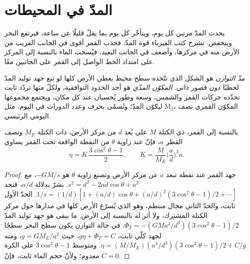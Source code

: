 \section{المدّ في المحيطات}\label{sec:b3:ocean-dynamics:tides}

يحدث المدّ مرتين كل يوم، ويتأخّر كل يوم بما يقلّ قليلًا عن ساعة، فيرتفع البحر
وينخفض. تشرح كتب الفيزياء قوة المدّ: فجذب القمر
أقوى في الجانب القريب من الأرض منه في مركزها، وأضعف في
الجانب البعيد، فيُسحب الماء بالنسبة إلى المركز على امتداد
الخط الواصل إلى القمر على الجانبين معًا.

\begin{definition}\label{def:b3:ocean-dynamics:tides}
\emph{مدّ التوازن} هو الشكل الذي تتّخذه
سطح محيط يغطي الأرض كلها لو تبع جهد توليد المدّ
لحظيًا دون قصور ذاتي. \emph{المكوّن
المدّي} هو أحد الحدود التوافقية، ولكلّ منها
تردّد ثابت تحدّده حركات القمر والشمس، وسعة وطور يُحسبان
عند كل مكان، ويجتمع مجموعها ليكوّن المدّ؛ وتُسمّى
بحرف وعدد الدورات في اليوم، مثل M$_2$، المكوّن
القمري نصف اليومي الرئيسي.
\end{definition}

\begin{theorem}\label{thm:b3:ocean-dynamics:equilibrium-tide}
بالنسبة إلى القمر، ذي الكتلة $M$ على بُعد $d$ من مركز الأرض، ذات
الكتلة $M_E$ ونصف القطر $a$، فإنّ  عند زاوية $\theta$ من
النقطة الواقعة تحت القمر يساوي
\[
\eta = K\,\frac{3\cos^2\theta - 1}{2},\qquad
K = \frac{M}{M_E}\Big(\frac{a}{d}\Big)^3 a .
\]
\end{theorem}

\begin{proof}
جهد القمر عند نقطة تبعد $a$ عن مركز الأرض
وتصنع زاوية $\theta$ هو $-GM/s$، مع $s^2 = d^2 - 2ad\cos\theta +
a^2$. نشرّ بدلالة $a/d$، فنجد $1/s = (1/d)[1 + (a/d)\cos\theta + (a/d)^2
(3\cos^2\theta - 1)/2 + \cdots]$. الحدّ الأول ثابت، والحدّ الثاني
مجال منتظم، وهو الذي يُسرّع الأرض كلها في مدارها
حول مركز الكتلة المشترك، ولا أثر له بالنسبة إلى الأرض.
ما يبقى هو جهد توليد المدّ $\Phi_T = -(GMa^2/d^3)(3
\cos^2\theta - 1)/2$. في حالة التوازن يكون سطح البحر سطحًا لجهد كلّي
ثابت، $g\eta + \Phi_T = C$، حيث $g = GM_E/a^2$، ومنه
$\eta = (M/M_E)(a^4/d^3)(3\cos^2\theta - 1)/2 + C/g$. ومتوسط
$3\cos^2\theta - 1$ على الكرة معدوم؛ ولأنّ حجم الماء
ثابت، فإنّ $C = 0$.
\end{proof}

